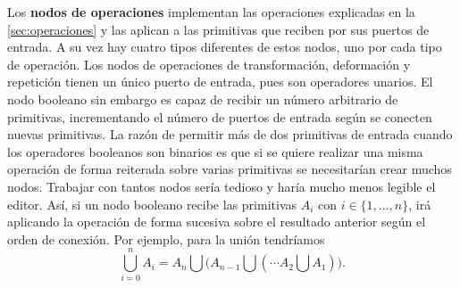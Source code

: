 Los \textbf{nodos de operaciones} implementan las operaciones explicadas en la \autoref{sec:operaciones} y las aplican a las primitivas que reciben por sus puertos de entrada. A su vez hay cuatro tipos diferentes de estos nodos, uno por cada tipo de operación. Los nodos de operaciones de transformación, deformación y repetición tienen un único puerto de entrada, pues son operadores unarios. El nodo booleano sin embargo es capaz de recibir un número arbitrario de primitivas, incrementando el número de puertos de entrada según se conecten nuevas primitivas. La razón de permitir más de dos primitivas de entrada cuando los operadores booleanos son binarios es que si se quiere realizar una misma operación de forma reiterada sobre varias primitivas se necesitarían crear muchos nodos. Trabajar con tantos nodos sería tedioso y haría mucho menos legible el editor. Así, si un nodo booleano recibe las primitivas $A_i$ con $i\in \{1,\dots, n\}$, irá aplicando la operación de forma sucesiva sobre el resultado anterior según el orden de conexión. Por ejemplo, para la unión tendríamos
\begin{equation*}
    \bigcup_{i=0}^n A_i = A_n\bigcup \Big(A_{n-1} \bigcup ( \cdots A_2 \bigcup A_1)\Big).
\end{equation*}
